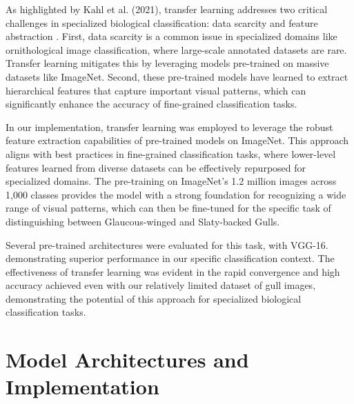 As highlighted by Kahl et al. (2021), transfer learning addresses two critical challenges in specialized biological classification: data scarcity and feature abstraction \citep{kahl2021}. First, data scarcity is a common issue in specialized domains like ornithological image classification, where large-scale annotated datasets are rare. Transfer learning mitigates this by leveraging models pre-trained on massive datasets like ImageNet. Second, these pre-trained models have learned to extract hierarchical features that capture important visual patterns, which can significantly enhance the accuracy of fine-grained classification tasks.

In our implementation, transfer learning was employed to leverage the robust feature extraction capabilities of pre-trained models on ImageNet. This approach aligns with best practices in fine-grained classification tasks, where lower-level features learned from diverse datasets can be effectively repurposed for specialized domains. The pre-training on ImageNet's 1.2 million images across 1,000 classes provides the model with a strong foundation for recognizing a wide range of visual patterns, which can then be fine-tuned for the specific task of distinguishing between Glaucous-winged and Slaty-backed Gulls.

Several pre-trained architectures were evaluated for this task, with VGG-16. \citep{simonyan2014vgg} demonstrating superior performance in our specific classification context. The effectiveness of transfer learning was evident in the rapid convergence and high accuracy achieved even with our relatively limited dataset of gull images, demonstrating the potential of this approach for specialized biological classification tasks.

\section{Model Architectures and Implementation}










